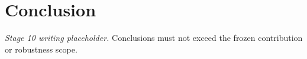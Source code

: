 \section{Conclusion}\label{sec:conclusion}
\emph{Stage 10 writing placeholder.} Conclusions must not exceed the frozen contribution or robustness scope.
